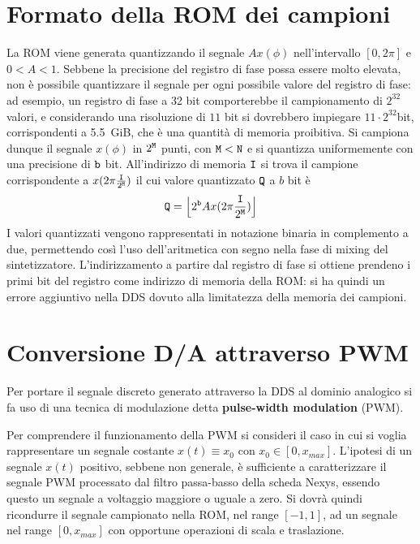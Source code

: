 \section{Formato della ROM dei campioni}
\label{sec:quantizationrom}
La ROM viene generata quantizzando il segnale $Ax(\phi)$ nell'intervallo
$[0, 2\pi]$ e $0 < A < 1$.
Sebbene la precisione del registro di fase possa essere molto elevata, non è
possibile quantizzare il segnale per ogni possibile valore del registro di fase:
ad esempio, un registro di fase a 32 bit comporterebbe il campionamento di $2^{32}$ valori,
e considerando una risoluzione di $11$ bit si dovrebbero impiegare $11\cdot2^{32}$bit,
corrispondenti a \SI{5.5}{GiB}, che è una quantità di memoria proibitiva.
Si campiona dunque il segnale $x(\phi)$ in $2^{\texttt{M}}$ punti, con $\texttt{M} < \texttt{N}$
e si quantizza uniformemente con una precisione di $\texttt{b}$ bit.
All'indirizzo di memoria $\texttt{I}$ si trova il campione corrispondente a
$x(2\pi \frac{\texttt{I}}{2^{\texttt{M}}})$ il cui valore quantizzato $\texttt{Q}$ a $b$ bit è
\begin{equation}
\label{eq:quantization}
\texttt{Q} = \Big \lfloor2^{\texttt{b}} Ax(2\pi \frac{\texttt{I}}{2^{\texttt{M}}})\Big \rfloor
\end{equation}
I valori quantizzati vengono rappresentati in notazione binaria in complemento a due,
permettendo così l'uso dell'aritmetica con segno nella fase di mixing del sintetizzatore.
L'indirizzamento a partire dal registro di fase si ottiene prendeno i primi 
bit del registro come indirizzo di memoria della ROM: si ha quindi un errore aggiuntivo
nella DDS dovuto alla limitatezza della memoria dei campioni.

\section{Conversione D/A attraverso PWM}
\label{sec:dapwm}
Per portare il segnale discreto generato attraverso la DDS al dominio analogico si fa uso di una tecnica di modulazione detta \textbf{pulse-width modulation} (PWM).

Per comprendere il funzionamento della PWM si consideri il caso in cui si voglia rappresentare un segnale costante $x(t) \equiv x_0$ con $x_0 \in [0, x_{max}]$.
L'ipotesi di un segnale $x(t)$ positivo, sebbene non generale, è sufficiente
a caratterizzare il segnale PWM processato dal filtro passa-basso della scheda
Nexys, essendo questo un segnale a voltaggio maggiore o uguale a zero.
Si dovrà quindi ricondurre il segnale campionato nella ROM, nel range $[-1,1]$,
ad un segnale nel range $[0,x_{max}]$ con opportune operazioni di scala e
traslazione.

